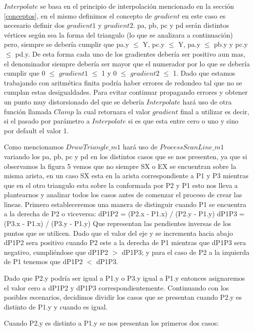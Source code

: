 \documentclass[a4paper]{article}
\begin{document}
$Interpolate$ se basa en el principio de interpolación mencionado en la sección \ref{conceptos}, en el mismo definimos el concepto de $gradient$ en este caso es necesario definir dos $gradient1$ y $gradient2$. pa, pb, pc y pd serán distintos vértices según sea la forma del triangulo (lo que se analizara a continuación) pero, siempre se debería cumplir que pa.y $\leq$ Y, pc.y $\leq$ Y, pa.y $\leq$ pb.y y pc.y $\leq$ pd.y. De esta forma cada uno de los gradientes debería ser positivo aun mas, el denominador siempre debería ser mayor que el numerador por lo que se debería cumplir que 0 $\leq$ $gradient1$ $\leq$ 1 y 0 $\leq$ $gradient2$ $\leq$ 1.  Dado que estamos trabajando con aritmética finita podría haber errores de redondeo tal que no se cumplan estas desigualdades. Para evitar continuar propagando errores y obtener un punto muy distorsionado del que se debería $Interpolate$ hará uso de otra función llamada $Clamp$ la cual retornara el valor $gradient$ final a utilizar es decir, si el pasado por parámetro a $Interpolate$ si es que esta entre cero o uno y sino por default el valor 1.


Como mencionamos $DrawTriangle\_m1$ hará uso de $ProcessScanLine\_m1$ variando los pa, pb, pc y pd en los distintos casos que se nos presenten, ya que si observamos la figura 5 vemos que no siempre SX o EX se encuentran sobre la misma arista, en un caso SX esta en la arista correspondiente a P1 y P3 mientras que en el otro triangulo esta sobre la conformada por P2 y P1 esto nos lleva a plantearnos y analizar todos los casos antes de comenzar el proceso de crear las lineas.
Primero estableceremos una manera de distinguir cuando P1 se encuentra a la derecha de P2 o viceversa: 
dP1P2 = (P2.x - P1.x) / (P2.y - P1.y) 
dP1P3 = (P3.x - P1.x) / (P3.y - P1.y)
Que representan las pendientes inversas de los puntos que se utilicen. Dado que el valor del eje y se incrementa hacia abajo dP1P2 sera positivo cuando P2 este a la derecha de P1 mientras que dP1P3 sera negativo, cumpliéndose que dP1P2 $>$ dP1P3; y para el caso de P2 a la izquierda de P1 tenemos que dP1P2 $<$ dP1P3. \par Dado que P2.y podría ser igual a P1.y o P3.y igual a P1.y entonces asignaremos el valor cero a dP1P2 y dP1P3 correspondientemente.
Continuando con los posibles escenarios, decidimos dividir los casos que se presentan cuando P2.y es distinto de P1.y y cuando es igual.\newline
\par Cuando P2.y es distinto a P1.y se nos presentan los primeros dos casos:
 
\end{document}
